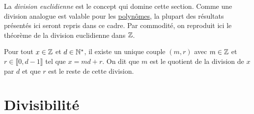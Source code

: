 
La \emph{division euclidienne} est le concept qui domine cette section. Comme une division analogue est valable pour les \href{\baseurl C1622.pdf}{polynômes}, la plupart des résultats présentés ici seront repris dans ce cadre. Par commodité, on reproduit ici le théorème de la division euclidienne  dans $\mathbb{Z}$.
\begin{thm}
  Pour tout $x\in \mathbb{Z}$ et $d\in \mathbb{N}^*$, il existe un unique couple $(m,r)$ avec $m\in \mathbb{Z}$ et $r\in \llbracket 0, d-1 \rrbracket$ tel que $x =md +r$. On dit que $m$ est le quotient de la division de $x$ par $d$ et que $r$ est le reste de cette division.
\end{thm}


\section{Divisibilité}
